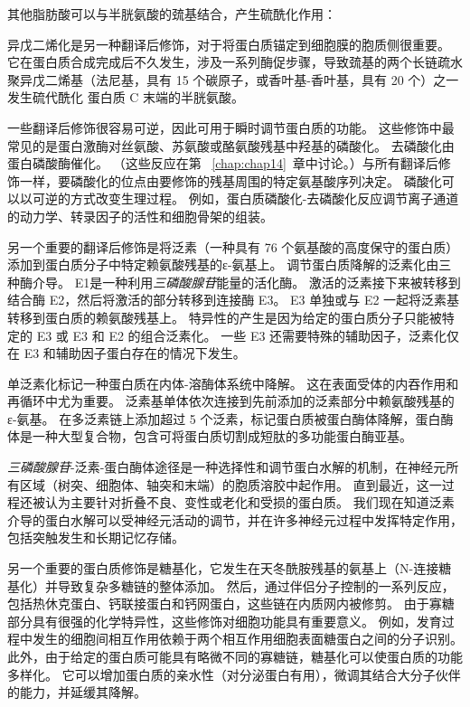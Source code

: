 其他脂肪酸可以与半胱氨酸的巯基结合，产生硫酰化作用：

异戊二烯化是另一种翻译后修饰，对于将蛋白质锚定到细胞膜的胞质侧很重要。
它在蛋白质合成完成后不久发生，涉及一系列酶促步骤，导致巯基的两个长链疏水聚异戊二烯基（法尼基，具有 15 个碳原子，或香叶基-香叶基，具有 20 个）之一发生硫代酰化 蛋白质 C 末端的半胱氨酸。


一些翻译后修饰很容易可逆，因此可用于瞬时调节蛋白质的功能。
这些修饰中最常见的是蛋白激酶对丝氨酸、苏氨酸或酪氨酸残基中羟基的磷酸化。
去磷酸化由蛋白磷酸酶催化。 （这些反应在第 ~\ref{chap:chap14}~章中讨论。）与所有翻译后修饰一样，要磷酸化的位点由要修饰的残基周围的特定氨基酸序列决定。
磷酸化可以以可逆的方式改变生理过程。
例如，蛋白质磷酸化-去磷酸化反应调节离子通道的动力学、转录因子的活性和细胞骨架的组装。


另一个重要的翻译后修饰是将泛素（一种具有 76 个氨基酸的高度保守的蛋白质）添加到蛋白质分子中特定赖氨酸残基的ε-氨基上。
调节蛋白质降解的泛素化由三种酶介导。
E1是一种利用\textit{三磷酸腺苷}能量的活化酶。
激活的泛素接下来被转移到结合酶 E2，然后将激活的部分转移到连接酶 E3。
E3 单独或与 E2 一起将泛素基转移到蛋白质的赖氨酸残基上。
特异性的产生是因为给定的蛋白质分子只能被特定的 E3 或 E3 和 E2 的组合泛素化。
一些 E3 还需要特殊的辅助因子，泛素化仅在 E3 和辅助因子蛋白存在的情况下发生。


单泛素化标记一种蛋白质在内体-溶酶体系统中降解。
这在表面受体的内吞作用和再循环中尤为重要。
泛素基单体依次连接到先前添加的泛素部分中赖氨酸残基的ε-氨基。
在多泛素链上添加超过 5 个泛素，标记蛋白质被蛋白酶体降解，蛋白酶体是一种大型复合物，包含可将蛋白质切割成短肽的多功能蛋白酶亚基。


\textit{三磷酸腺苷}-泛素-蛋白酶体途径是一种选择性和调节蛋白水解的机制，在神经元所有区域（树突、细胞体、轴突和末端）的胞质溶胶中起作用。
直到最近，这一过程还被认为主要针对折叠不良、变性或老化和受损的蛋白质。
我们现在知道泛素介导的蛋白水解可以受神经元活动的调节，并在许多神经元过程中发挥特定作用，包括突触发生和长期记忆存储。


另一个重要的蛋白质修饰是糖基化，它发生在天冬酰胺残基的氨基上（N-连接糖基化）并导致复杂多糖链的整体添加。
然后，通过伴侣分子控制的一系列反应，包括热休克蛋白、钙联接蛋白和钙网蛋白，这些链在内质网内被修剪。 
由于寡糖部分具有很强的化学特异性，这些修饰对细胞功能具有重要意义。
例如，发育过程中发生的细胞间相互作用依赖于两个相互作用细胞表面糖蛋白之间的分子识别。
此外，由于给定的蛋白质可能具有略微不同的寡糖链，糖基化可以使蛋白质的功能多样化。
它可以增加蛋白质的亲水性（对分泌蛋白有用），微调其结合大分子伙伴的能力，并延缓其降解。


